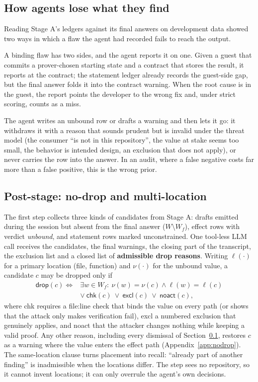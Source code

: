 \subsection{How agents lose what they find}\label{sec:design-lose}

Reading Stage A's ledgers against its final answers on development data
showed two ways in which a flaw the agent had recorded fails to reach the
output.

A binding flaw has two sides, and the agent reports it on one. Given a guest
that commits a prover-chosen starting state and a contract that stores the
result, it reports at the contract; the statement ledger already records the
guest-side gap, but the final answer folds it into the contract warning. When
the root cause is in the guest, the report points the developer to the wrong
fix and, under strict scoring, counts as a miss.

The agent writes an unbound row or drafts a warning and then lets it go: it
withdraws it with a reason that sounds prudent but is invalid under the
threat model (the consumer ``is not in this repository'', the value at stake
seems too small, the behavior is intended design, an exclusion that does not
apply), or never carries the row into the answer. In an audit, where
a false negative costs far more than a false positive, this is the wrong
prior.

\subsection{Post-stage: no-drop and multi-location}\label{sec:design-post}

The first step collects three kinds of candidates from Stage A: drafts
emitted during the session but absent from the final answer
($W\setminus W_f$), effect rows with verdict \emph{unbound}, and statement
rows marked unconstrained. One tool-less LLM call receives the candidates, the
final warnings, the closing part of the transcript, the exclusion list and a
closed list of \textbf{admissible drop reasons}. Writing $\ell(\cdot)$ for a
primary location (file, function) and $\nu(\cdot)$ for the unbound value, a
candidate $c$ may be dropped only if
\[
\begin{aligned}
\textsf{drop}(c)\iff{}&\exists w\in W_f:\ \nu(w)=\nu(c)\wedge \ell(w)=\ell(c)\\
&\vee\ \textsf{chk}(c)\ \vee\ \textsf{excl}(c)\ \vee\ \textsf{noact}(c),
\end{aligned}
\]
where \textsf{chk} requires a file:line check that binds the value on every
path (or shows that the attack only makes verification fail), \textsf{excl} a
numbered exclusion that genuinely applies, and \textsf{noact} that the
attacker changes nothing while keeping a valid proof. Any other reason,
including every dismissal of Section~\ref{sec:design-lose}, restores $c$ as a
warning where the value enters the effect path (Appendix~\ref{app:nodrop}).
The same-location clause turns placement into recall: ``already part of
another finding'' is inadmissible when the locations differ. The step sees no
repository, so it cannot invent locations; it can only overrule the agent's
own decisions.

